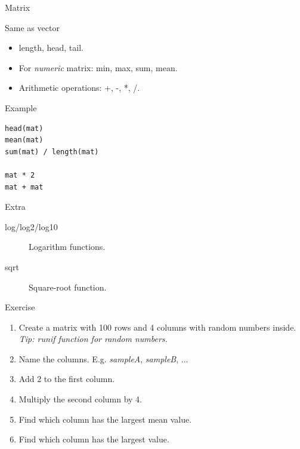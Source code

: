 \documentclass[10pt]{beamer}
\begin{document}
\begin{frame}[fragile]{Matrix}
  \begin{block}{Same as {\sf vector}}
    \begin{itemize}
    \item {\sf length}, {\sf head}, {\sf tail}.
    \item For {\it numeric} {\sf matrix}: {\sf min}, {\sf max}, {\sf sum}, {\sf mean}.
    \item Arithmetic operations: +, -, *, /.
    \end{itemize}
  \end{block}
  \begin{exampleblock}{Example}
\begin{verbatim}
head(mat)
mean(mat)
sum(mat) / length(mat)

mat * 2
mat + mat
\end{verbatim}
  \end{exampleblock}
\begin{alertblock}{Extra}
  \begin{description}
  \item[log/log2/log10] Logarithm functions.
  \item[sqrt] Square-root function.
  \end{description}
\end{alertblock}
\end{frame}


\begin{frame}{Exercise}
  \begin{enumerate}
  \item Create a {\sf matrix} with 100 rows and 4 columns with random numbers inside. {\scriptsize\it Tip: {\sf runif} function for random numbers.}
  \item Name the columns. E.g. {\it sampleA}, {\it sampleB}, ...
  \item Add 2 to the first column.
  \item Multiply the second column by 4.
  \item Find which column has the largest mean value.
  \item Find which column has the largest value.
  \end{enumerate}
\end{frame}
\end{document}
